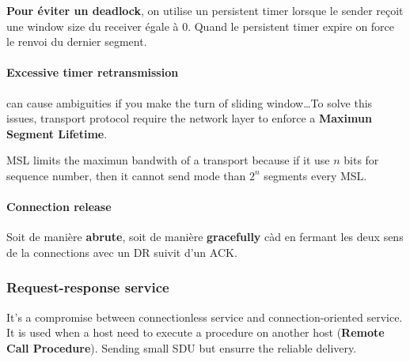 \textbf{Pour éviter un deadlock}, on utilise un persistent timer lorsque le sender reçoit une
window size du receiver égale à 0. Quand le persistent timer expire on force le renvoi du dernier segment.

\paragraph{Excessive timer retransmission} can cause ambiguities if
you make the turn of sliding window\ldots To solve this issues, transport protocol
require the network layer to enforce a \textbf{Maximun Segment Lifetime}.

\textsc{MSL} limits the maximun bandwith of a transport because if it use $n$ bits
for sequence number, then it cannot send mode than $2^n$ segments every MSL.

\paragraph{\textbf{Connection release}}
Soit de manière \textbf{abrute}, soit de manière \textbf{gracefully} càd en fermant
les deux sens de la connections avec un DR suivit d'un ACK.

\subsubsection{Request-response service}
It's a compromise between connectionless service and connection-oriented service. It is used when a host 
need to execute a procedure on another host (\textbf{Remote Call Procedure}). Sending small SDU but 
ensurre the reliable delivery.

